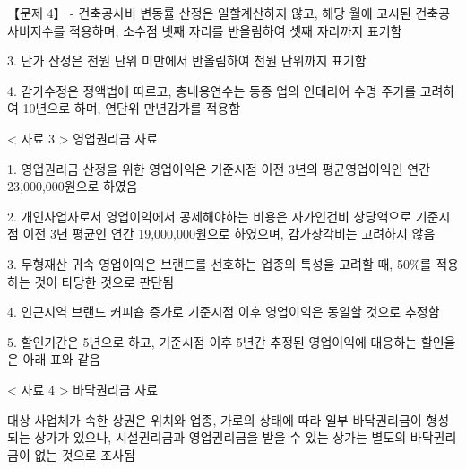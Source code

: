\begin{longquestion}{【문제 4】}
- 건축공사비 변동률 산정은 일할계산하지 않고, 해당 월에 고시된 건축공사비지수를 적용하며, 소수점 넷째 자리를 반올림하여 셋째 자리까지 표기함 \par
3. 단가 산정은 천원 단위 미만에서 반올림하여 천원 단위까지 표기함 \par
4. 감가수정은 정액법에 따르고, 총내용연수는 동종 업의 인테리어 수명 주기를 고려하여 10년으로 하며, 연단위 만년감가를 적용함 \par
< 자료 3 > 영업권리금 자료 \par
1. 영업권리금 산정을 위한 영업이익은 기준시점 이전 3년의 평균영업이익인 연간 23,000,000원으로 하였음 \par
2. 개인사업자로서 영업이익에서 공제해야하는 비용은 자가인건비 상당액으로 기준시점 이전 3년 평균인 연간 19,000,000원으로 하였으며, 감가상각비는 고려하지 않음 \par
3. 무형재산 귀속 영업이익은 브랜드를 선호하는 업종의 특성을 고려할 때, 50\%를 적용하는 것이 타당한 것으로 판단됨 \par
4. 인근지역 브랜드 커피숍 증가로 기준시점 이후 영업이익은 동일할 것으로 추정함 \par
5. 할인기간은 5년으로 하고, 기준시점 이후 5년간 추정된 영업이익에 대응하는 할인율은 아래 표와 같음 \par
{\small\centering\renewcommand{\arraystretch}{1.25}
\par}

< 자료 4 > 바닥권리금 자료 \par
대상 사업체가 속한 상권은 위치와 업종, 가로의 상태에 따라 일부 바닥권리금이 형성되는 상가가 있으나, 시설권리금과 영업권리금을 받을 수 있는 상가는 별도의 바닥권리금이 없는 것으로 조사됨 \par
\end{longquestion}
